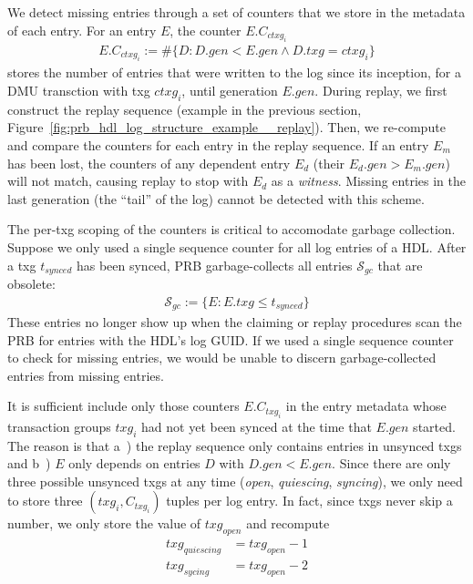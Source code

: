 \documentclass[12pt,a4paper,twoside]{book}
\begin{document}
We detect missing entries through a set of counters that we store in the metadata of each entry.
For an entry $E$, the counter $E.C_{ctxg_i}$
\begin{gather*}
    E.C_{ctxg_i} := \#\{ D : D.gen < E.gen \wedge D.txg = ctxg_i\}
\end{gather*}
stores the number of entries that were written to the log since its inception, for a DMU transction with txg $ctxg_i$, until generation $E.gen$.
During replay, we first construct the replay sequence (example in the previous section, Figure~\ref{fig:prb_hdl_log_structure_example__replay}).
Then, we re-compute and compare the counters for each entry in the replay sequence.
If an entry $E_m$ has been lost, the counters of any dependent entry $E_d$ (their $E_d.gen > E_m.gen$) will not match, causing replay to stop with $E_d$ as a \textit{witness}.
Missing entries in the last generation (the ``tail'' of the log) cannot be detected with this scheme.

The per-txg scoping of the counters is critical to accomodate garbage collection.
Suppose we only used a single sequence counter for all log entries of a HDL.
After a txg $t_{synced}$ has been synced, PRB garbage-collects all entries $\mathcal{S}_{gc}$ that are obsolete:
\begin{align*}
    \mathcal{S}_{gc} := \{ E : E.txg \le t_{synced}\}
\end{align*}
These entries no longer show up when the claiming or replay procedures scan the PRB for entries with the HDL's log GUID.
If we used a single sequence counter to check for missing entries, we would be unable to discern garbage-collected entries from missing entries.

It is sufficient include only those counters $E.C_{txg_i}$ in the entry metadata whose transaction groups $txg_i$ had not yet been synced at the time that $E.gen$ started.
The reason is that a~) the replay sequence only contains entries in unsynced txgs and b~) $E$ only depends on entries $D$ with $D.gen < E.gen$.
Since there are only three possible unsynced txgs at any time (\textit{open}, \textit{quiescing}, \textit{syncing}), we only need to store three $(txg_i, C_{txg_i})$ tuples per log entry.
In fact, since txgs never skip a number, we only store the value of $txg_{open}$ and recompute
\begin{align*}
    txg_{quiescing} & = txg_{open} - 1 \\
    txg_{sycing} & = txg_{open} - 2
\end{align*}
\end{document}
